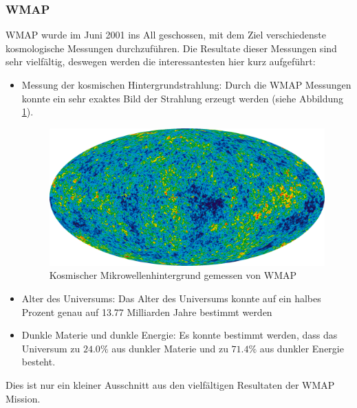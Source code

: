 \subsubsection{\ac{WMAP}}
\ac{WMAP} wurde im Juni 2001 ins All geschossen, mit dem Ziel verschiedenste 
kosmologische Messungen durchzuführen.
Die Resultate dieser Messungen sind sehr vielfältig, deswegen werden die 
interessantesten hier kurz aufgeführt:
\begin{itemize}
	\item Messung der kosmischen Hintergrundstrahlung: Durch die \ac{WMAP} 
	Messungen konnte ein sehr exaktes Bild der Strahlung erzeugt werden (siehe 
	Abbildung \ref{fig:CMB_WMAP}).
	\begin{figure}
		\includegraphics[width=\linewidth]{cmb/images/CMB_WMAP.png}
		\caption{Kosmischer Mikrowellenhintergrund gemessen von \ac{WMAP}}
		\label{fig:CMB_WMAP}
	\end{figure}
	\item Alter des Universums: Das Alter des Universums konnte auf ein halbes 
	Prozent genau auf 13.77 Milliarden Jahre bestimmt werden
	\item Dunkle Materie und dunkle Energie: Es konnte bestimmt werden, dass 
	das Universum zu $24.0 \%$ aus dunkler Materie und zu $71.4\%$ aus 
	dunkler Energie besteht.
\end{itemize}
Dies ist nur ein kleiner Ausschnitt aus den vielfältigen Resultaten der 
\ac{WMAP} Mission. \cite{CMB_WMAP}

